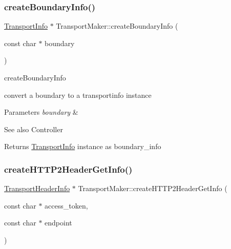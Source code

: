 \subsubsection{\texorpdfstring{create\+Boundary\+Info()}{createBoundaryInfo()}}
{\footnotesize\ttfamily \hyperlink{classAlexaEvent_1_1TransportInfo}{Transport\+Info} $\ast$ Transport\+Maker\+::create\+Boundary\+Info (\begin{DoxyParamCaption}\item[{const char $\ast$}]{boundary }\end{DoxyParamCaption})}



create\+Boundary\+Info 

convert a boundary to a transportinfo instance 
\begin{DoxyParams}{Parameters}
{\em boundary} & \\
\hline
\end{DoxyParams}
\begin{DoxySeeAlso}{See also}
Controller 
\end{DoxySeeAlso}
\begin{DoxyReturn}{Returns}
\hyperlink{classAlexaEvent_1_1TransportInfo}{Transport\+Info} instance as boundary\+\_\+info 
\end{DoxyReturn}
\mbox{\label{classAlexaEvent_1_1TransportMaker_a1ec78cac69e3243b492fcdafcc21a7fb}} 
\subsubsection{\texorpdfstring{create\+H\+T\+T\+P2\+Header\+Get\+Info()}{createHTTP2HeaderGetInfo()}}
{\footnotesize\ttfamily \hyperlink{classAlexaEvent_1_1TransportHeaderInfo}{Transport\+Header\+Info} $\ast$ Transport\+Maker\+::create\+H\+T\+T\+P2\+Header\+Get\+Info (\begin{DoxyParamCaption}\item[{const char $\ast$}]{access\+\_\+token,  }\item[{const char $\ast$}]{endpoint }\end{DoxyParamCaption})}



